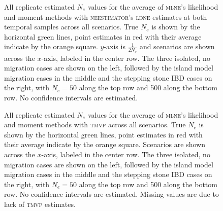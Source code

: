 \begin{landscape}
\begin{figure}[h!]
\centering
{}
\caption[All replicate estimated $N_e$ values for the average of \textsc{mlne}'s likelihood and moment methods with \textsc{neestimator}'s \textsc{ldne} estimates at both temporal samples across all scenarios.]{All replicate estimated $N_e$ values for the average of \textsc{mlne}'s likelihood and moment methods with \textsc{neestimator}'s \textsc{ldne} estimates at both temporal samples across all scenarios. True $N_e$ is shown by the horizontal green lines, point estimates in red with their average indicate by the orange square. $y$-axis is $\frac{1}{2 N_e}$ and scenarios are shown across the $x$-axis, labeled in the center row. The three isolated, no migration cases are shown on the left, followed by the island model migration cases in the middle and the stepping stone IBD cases on the right, with $N_e = 50$ along the top row and 500 along the bottom row. No confidence intervals are estimated.}
\label{fig:supp_avg3}
\end{figure}


\begin{figure}[h!]
\centering
{}
\caption[All replicate estimated $N_e$ values for the average of \textsc{mlne}'s likelihood and moment methods with \textsc{tmvp} across all scenarios.]{All replicate estimated $N_e$ values for the average of \textsc{mlne}'s likelihood and moment methods with \textsc{tmvp} across all scenarios. True $N_e$ is shown by the horizontal green lines, point estimates in red with their average indicate by the orange square. Scenarios are shown across the $x$-axis, labeled in the center row. The three isolated, no migration cases are shown on the left, followed by the island model migration cases in the middle and the stepping stone IBD cases on the right, with $N_e = 50$ along the top row and 500 along the bottom row. No confidence intervals are estimated. Missing values are due to lack of \textsc{tmvp} estimates.}
\label{fig:supp_avg4}
\end{figure}



\end{landscape}

